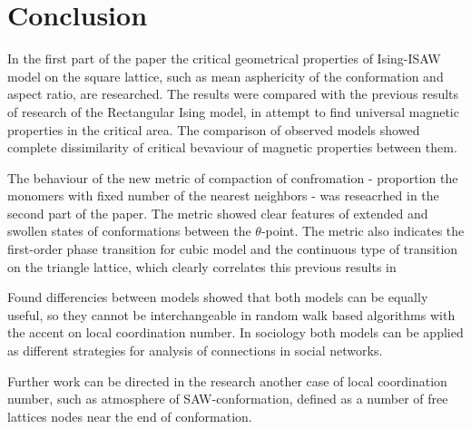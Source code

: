 \section{Conclusion}

In the first part of the paper the critical geometrical properties of Ising-ISAW model on the square lattice, such as mean asphericity of the conformation and aspect ratio, are researched. The results were compared with the previous results of research of the Rectangular Ising model, in attempt to find universal magnetic properties in the critical area. The comparison of observed models showed complete dissimilarity of critical bevaviour of magnetic properties between them.

The behaviour of the new metric of compaction of confromation - proportion the monomers with fixed number of the nearest neighbors - was reseacrhed in the second part of the paper. 
The metric showed clear features of extended and swollen states of conformations between the $\theta$-point. 
The metric also indicates the first-order phase transition for cubic model and the continuous type of transition on the triangle lattice, which clearly correlates this previous results in \cite{Foster2021, faizullina2021critical}

Found differencies between models showed that both models can be equally useful, so they cannot be interchangeable in random walk based algorithms with the accent on local coordination number. 
In sociology both models can be applied as different strategies for analysis of connections in social networks.

Further work can be directed in the research another case of local coordination number, such as atmosphere of SAW-conformation, defined as a number of free lattices nodes near the end of conformation.
